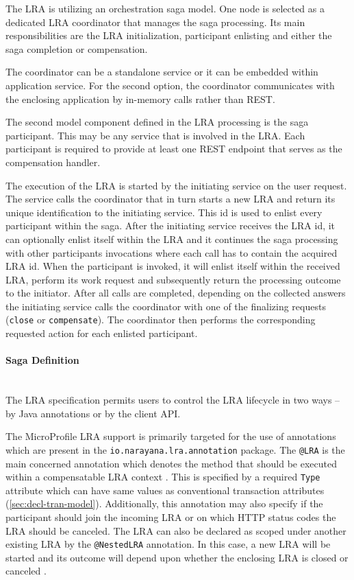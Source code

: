 \documentclass[oneside,
  digital, %
  table,   %
  lof,     %
  lot,     %
]{fithesis3}
\newcommand{\newlinepar}[1]{\paragraph{#1}\needspace{4\baselineskip}\mbox{}\\}
\begin{document}
The LRA is utilizing an orchestration saga model. One node is selected as a dedicated LRA coordinator that manages the saga processing. Its main responsibilities are the LRA initialization, participant enlisting and either the saga completion or compensation. 

The coordinator can be a standalone service or it can be embedded within application service. For the second option, the coordinator communicates with the enclosing application by in-memory calls rather than REST.

The second model component defined in the LRA processing is the saga participant. This may be any service that is involved in the LRA. Each participant is required to provide at least one REST endpoint that serves as the compensation handler.

The execution of the LRA is started by the initiating service on the user request. The service calls the coordinator that in turn starts a new LRA and return its  unique identification to the initiating service. This id is used to enlist every participant within the saga. After the initiating service receives the LRA id, it can optionally enlist itself within the LRA and it continues the saga processing with other participants invocations where each call has to contain the acquired LRA id. When the participant is invoked, it will enlist itself within the received LRA, perform its work request and subsequently return the processing outcome to the initiator. After all calls are completed, depending on the collected answers the initiating service calls the coordinator with one of the finalizing requests (\texttt{close} or \texttt{compensate}). The coordinator then performs the corresponding requested action for each enlisted participant.
 
\newlinepar{Saga Definition}

The LRA specification permits users to control the LRA lifecycle in two ways -- by Java annotations or by the client API. 

The MicroProfile LRA support is primarily targeted for the use of annotations which are present in the \texttt{io.narayana.lra.annotation} package. The \texttt{@LRA} is the main concerned annotation which denotes the method that should be executed within a compensatable LRA context \cite{narayana_lra}. This is specified by a required \texttt{Type} attribute which can have same values as conventional transaction attributes (\ref{sec:decl-tran-model}). Additionally, this annotation may also specify if the participant should join the incoming LRA or on which HTTP status codes the LRA should be canceled. The LRA can also be declared as scoped under another existing LRA by the \texttt{@NestedLRA} annotation. In this case, a new LRA will be started and its outcome will depend upon whether the enclosing LRA is closed or canceled \cite{narayana_lra}.
\end{document}
